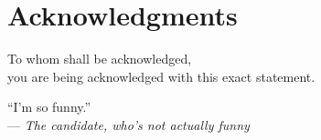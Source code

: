 
\begingroup
    \let\clearpage\relax
    \let\cleardoublepage\relax
    \let\cleardoublepage\relax

    \chapter*{Acknowledgments}
    To whom shall be acknowledged, \\
    you are being acknowledged with this exact statement.

\endgroup

\bigskip

\begin{flushright}{%
    ``I'm so funny.''
    } \\ \medskip
    --- \textit{The candidate, who's not actually funny}
\end{flushright}



